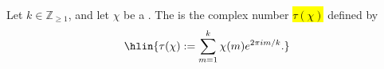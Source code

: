 \begin{definition} \label{definition:gauss_sum_of_a_dirichlet_character}
Let $k \in \mathbb{Z}_{\geq 1}$, and let $\chi$ be a . The  is the complex number \hl{$\tau(\chi)$} defined by
$$\hlin{\tau(\chi) := \sum_{m=1}^k \chi(m) e^{2\pi i m / k}.}$$
\end{definition}
